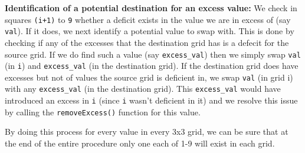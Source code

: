 \documentclass{article}
\begin{document}
\bigskip
\textbf{Identification of a potential destination for an excess value:} We check in squares \texttt{(i+1)} to \texttt{9} whether a deficit exists in the value we are in excess of (say \texttt{val}). If it does, we next identify a potential value to swap with. This is done by checking if any of the excesses that the destination grid has is a defecit for the source grid. If we do find such a value (say \texttt{excess\_val}) then we simply swap \texttt{val} (in \texttt{i}) and \texttt{excess\_val} (in the destination grid). If the destination grid does have excesses but not of values the source grid is deficient in, we swap \texttt{val} (in grid i) with any \texttt{excess\_val} (in the destination grid). This \texttt{excess\_val} would have introduced an excess in \texttt{i} (since \texttt{i} wasn't deficient in it) and we resolve this issue by calling the \texttt{removeExcess()} function for this value.

\bigskip
By doing this process for every value in every 3x3 grid, we can be sure that at the end of the entire procedure only one each of 1-9 will exist in each grid.
\end{document}
